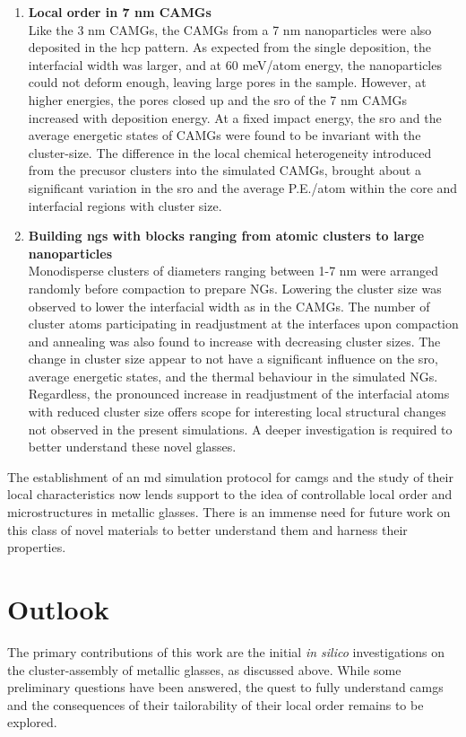 \begin{enumerate}[leftmargin=*]
\begin{enumerate}[leftmargin=*]
\item \textbf{Local order in 7 nm \cz CAMGs}\\
Like the 3 nm CAMGs, the CAMGs from a 7 nm nanoparticles were also deposited in the \gls{hcp} pattern. As expected from the single deposition, the interfacial width was larger, and at 60 meV/atom energy, the nanoparticles could not deform enough, leaving large pores in the sample. However, at higher energies, the pores closed up and the \gls{sro} of the 7 nm CAMGs increased with deposition energy. At a fixed impact energy, the \gls{sro} and the average energetic states of CAMGs were found to be invariant with the cluster-size. The difference in the local chemical heterogeneity introduced from the precusor clusters into the simulated CAMGs, brought about a significant variation in the \gls{sro} and the average P.E./atom within the core and interfacial regions with cluster size. 

\item \textbf{Building \gls{ng}s with blocks ranging from atomic clusters to large nanoparticles} \\
Monodisperse clusters of diameters ranging between 1-7 nm were arranged randomly before compaction to prepare \cz NGs. Lowering the cluster size was observed to lower the interfacial width as in the CAMGs. The number of cluster atoms participating in readjustment at the interfaces upon compaction and annealing was also found to increase with decreasing cluster sizes. The change in cluster size appear to not have a significant influence on the \gls{sro}, average energetic states, and the thermal behaviour in the simulated NGs. Regardless, the pronounced increase in readjustment of the interfacial atoms with reduced cluster size offers scope for interesting local structural changes not observed in the present simulations. A deeper investigation is required to better understand these novel glasses. 
\end{enumerate}
\end{enumerate}

The establishment of an \gls{md} simulation protocol for \gls{camg}s and the study of their local characteristics now lends support to the idea of controllable local order and microstructures in metallic glasses. There is an immense need for future work on this class of novel materials to better understand them and harness their properties.

\clearpage
\section{Outlook}
The primary contributions of this work are the initial \textit{in silico} investigations on the cluster-assembly of metallic glasses, as discussed above. While some preliminary questions have been answered, the quest to fully understand \gls{camg}s and the consequences of their tailorability of their local order remains to be explored.

